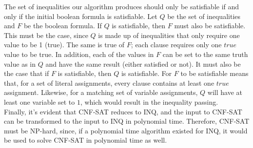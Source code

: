 \documentclass[letterpaper,notitlepage,twoside]{article}
\begin{document}
The set of inequalities our algorithm produces should only be satisfiable if and only if the initial boolean formula is satisfiable. Let $Q$ be the set of inequalities and $F$ be the boolean formula. If $Q$ is satisfiable, then $F$ must also be satisfiable. This must be the case, since $Q$ is made up of inequalities that only require one value to be 1 (true). The same is true of $F$; each clause requires only one $true$ value to be true. In addition, each of the values in $F$ can be set to the same truth value as in $Q$ and have the same result (either satisfied or not). It must also be the case that if $F$ is satisfiable, then $Q$ is satisfiable. For $F$ to be satisfiable means that, for a set of literal assignments, every clause contains at least one $true$ assignment. Likewise, for a matching set of variable assignments, $Q$ will have at least one variable set to $1$, which would result in the inequality passing. \\

Finally, it's evident that CNF-SAT reduces to INQ, and the input to CNF-SAT can be transformed to the input to INQ in polynomial time. Therefore, CNF-SAT must be NP-hard, since, if a polynomial time algorithm existed for INQ, it would be used to solve CNF-SAT in polynomial time as well.
\end{document}
